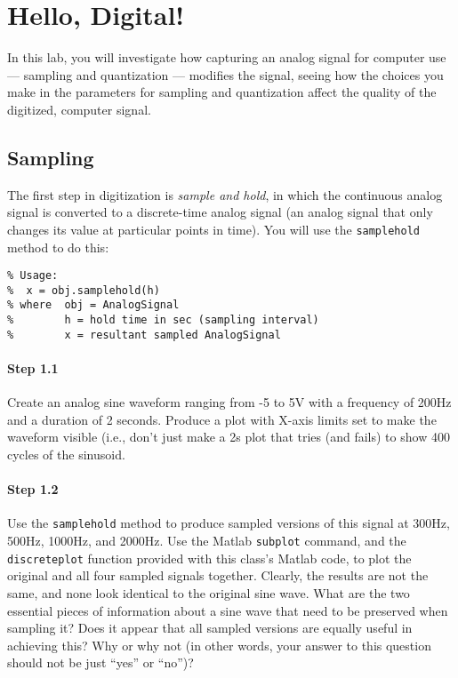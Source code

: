 
\section{Hello, Digital!}

In this lab, you will investigate how capturing an analog signal for
computer use --- sampling and quantization --- modifies the signal,
seeing how the choices you make in the parameters for sampling and
quantization affect the quality of the digitized, computer signal.

\subsection{Sampling}

The first step in digitization is \emph{sample and hold}, in which the
continuous analog signal is converted to a discrete-time analog signal
(an analog signal that only changes its value at particular points in
time). You will use the \texttt{samplehold} method to do this:
\begin{lstlisting}[style=Matlab-editor,basicstyle=\mlttfamily\small]
% samplehold Perform a sample and hold function on an AnalogSignal
% Usage:
%  x = obj.samplehold(h)
% where  obj = AnalogSignal
%        h = hold time in sec (sampling interval)
%        x = resultant sampled AnalogSignal
\end{lstlisting}

\paragraph{Step 1.1} Create an analog sine waveform ranging from -5 to
5V with a frequency of 200Hz and a duration of 2 seconds. Produce a
plot with X-axis limits set to make the waveform visible (i.e., don't
just make a 2s plot that tries (and fails) to show 400 cycles of the
sinusoid.

\paragraph{Step 1.2} Use the \texttt{samplehold} method to produce
sampled versions of this signal at 300Hz, 500Hz, 1000Hz, and
2000Hz. Use the Matlab \texttt{subplot} command, and the
\texttt{discreteplot} function provided with this class's Matlab code,
to plot the original and all four sampled signals together. Clearly,
the results are not the same, and none look identical to the original
sine wave. What are the two essential pieces of information about a
sine wave that need to be preserved when sampling it? Does it appear
that all sampled versions are equally useful in achieving this? Why or
why not (in other words, your answer to this question should not be
just ``yes'' or ``no'')?

